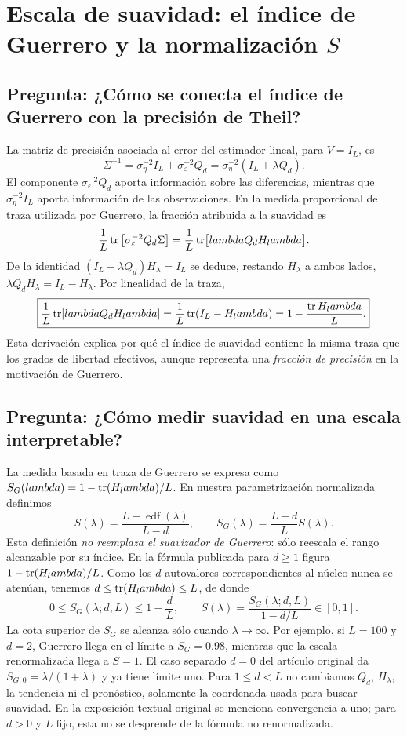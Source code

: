 \documentclass[11pt,letterpaper,parskip=half,headings=small]{scrartcl}
\theoremstyle{definition}\newtheorem{definicion}[proposicion]{Definición}
\theoremstyle{remark}\newtheorem{observacion}[proposicion]{Observación}
\newcommand{\pregunta}[1]{\subsection{Pregunta: #1}}
\begin{document}
\section{Escala de suavidad: el índice de Guerrero y la normalización $S$}
\pregunta{¿Cómo se conecta el índice de Guerrero con la precisión de Theil?}
La matriz de precisión asociada al error del estimador lineal, para $V=I_L$, es
\[
\Sigma^{-1}=\sigma_\eta^{-2}I_L+\sigma_\varepsilon^{-2}Q_d
=\sigma_\eta^{-2}(I_L+\lambda Q_d).
\]
El componente $\sigma_\varepsilon^{-2}Q_d$ aporta información sobre las diferencias, mientras que $\sigma_\eta^{-2}I_L$ aporta información de las observaciones. En la medida proporcional de traza utilizada por Guerrero, la fracción atribuida a la suavidad es
\[
\frac1L\operatorname{tr}\left[\sigma_\varepsilon^{-2}Q_d\Sigma\right]
=\frac1L\operatorname{tr}\bigl[lambda Q_dH_lambda\bigr].
\]
De la identidad $(I_L+\lambda Q_d)H_\lambda=I_L$ se deduce, restando $H_\lambda$ a ambos lados,
$\lambda Q_dH_\lambda=I_L-H_\lambda$. Por linealidad de la traza,
\begin{equation}\label{eq:theil}
\boxed{\frac1L\operatorname{tr}[lambda Q_dH_lambda]
=\frac1L\operatorname{tr}(I_L-H_lambda)=1-\frac{\operatorname{tr} H_lambda}{L}.}
\end{equation}
Esta derivación explica por qué el índice de suavidad contiene la misma traza que los grados de libertad efectivos, aunque representa una \emph{fracción de precisión} en la motivación de Guerrero.

\pregunta{¿Cómo medir suavidad en una escala interpretable?}
La medida basada en traza de Guerrero se expresa como $S_G(lambda)=1-\operatorname{tr}(H_lambda)/L$. En nuestra parametrización normalizada definimos
\begin{equation}\label{eq:S}\boxed{S(\lambda)=\frac{L-\operatorname{edf}(\lambda)}{L-d},
\qquad S_G(\lambda)=\frac{L-d}{L}S(\lambda).}\end{equation}
Esta definición \emph{no reemplaza el suavizador de Guerrero}: sólo reescala el rango alcanzable por su índice. En la fórmula publicada para $d\geq1$ figura $1-\operatorname{tr}(H_lambda)/L$. Como los $d$ autovalores correspondientes al núcleo nunca se atenúan, tenemos $d\le\operatorname{tr}(H_lambda)\le L$, de donde
\[
\boxed{0\le S_G(\lambda;d,L)\le1-\frac dL,\qquad
S(\lambda)=\frac{S_G(\lambda;d,L)}{1-d/L}\in[0,1].}
\]
La cota superior de $S_G$ se alcanza sólo cuando $\lambda\to\infty$. Por ejemplo, si $L=100$ y $d=2$, Guerrero llega en el límite a $S_G=0.98$, mientras que la escala renormalizada llega a $S=1$. El caso separado $d=0$ del artículo original da $S_{G,0}=\lambda/(1+\lambda)$ y ya tiene límite uno. Para $1\le d<L$ no cambiamos $Q_d$, $H_\lambda$, la tendencia ni el pronóstico, solamente la coordenada usada para buscar suavidad. En la exposición textual original se menciona convergencia a uno; para $d>0$ y $L$ fijo, esta no se desprende de la fórmula no renormalizada.
\end{document}
